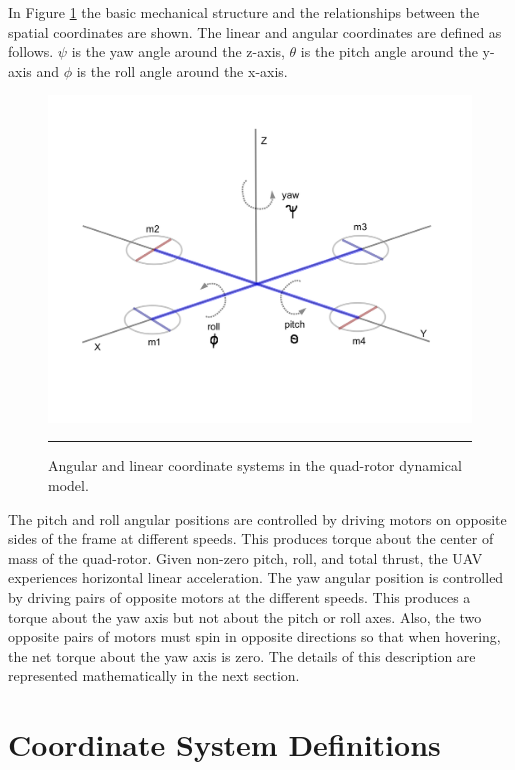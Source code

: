  In Figure \ref{fig:Quad-Rotor Coordinate System} the basic mechanical structure and the relationships between the spatial coordinates are shown. The linear and angular coordinates are defined as follows. $ \psi $ is the yaw angle around the z-axis, $ \theta $ is the pitch angle around the y-axis and $ \phi $ is the roll angle around the x-axis.\\
\begin{figure}[htbp]
  \centering
    \includegraphics[scale = 0.5]{Figures/coords.png}
    \rule{35em}{0.5pt}
  \caption[Angular and linear coordinate systems in the quad-rotor dynamical model.]{Angular and linear coordinate systems in the quad-rotor dynamical model.}
  \label{fig:Quad-Rotor Coordinate System}
\end{figure}

 The pitch and roll angular positions are controlled by driving motors on opposite sides of the frame at different speeds. This produces torque about the center of mass of the quad-rotor. Given non-zero pitch, roll, and total thrust, the UAV experiences horizontal linear acceleration. The yaw angular position is controlled by driving pairs of opposite motors at the different speeds. This produces a torque about the yaw axis but not about the pitch or roll axes. Also, the two opposite pairs of motors must spin in opposite directions so that when hovering, the net torque about the yaw axis is zero. The details of this description are represented mathematically in the next section.

\section{Coordinate System Definitions}

